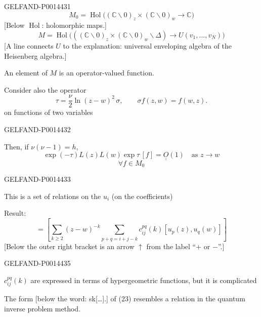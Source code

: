 \begin{GelfandAdjacentEvidence}{GELFAND-P001443}{1}
\[
M_0=\operatorname{Hol}\bigl((\mathbb C\backslash0)_z\times
(\mathbb C\backslash0)_w\longrightarrow\mathbb C\bigr)
\]
[Below \(\operatorname{Hol}\): holomorphic maps.]
\[
M=\operatorname{Hol}\bigl(((\mathbb C\backslash0)_z\times
(\mathbb C\backslash0)_w\backslash\Delta)\longrightarrow U(v_1,\ldots,v_N)\bigr)
\]
[A line connects \(U\) to the explanation: universal enveloping algebra of the Heisenberg algebra.]

An element of \(M\) is an operator-valued function.

Consider also the operator
\[
\tau=\frac{\nu}{2}\ln(z-w)^2\,\sigma,\qquad \sigma f(z,w)=f(w,z).
\]
on functions of two variables
\end{GelfandAdjacentEvidence}
\begin{GelfandAdjacentEvidence}{GELFAND-P001443}{2}


Then, if \(\nu(\nu-1)=h\),
\begin{equation*}
\exp(-\tau)L(z)L(w)\exp\tau\,[f]=\underline{\underline{O}}(1)
\quad\text{as }z\longrightarrow w \tag{23}
\end{equation*}
\[
\forall f\in M_0
\]
\end{GelfandAdjacentEvidence}
\begin{GelfandAdjacentEvidence}{GELFAND-P001443}{3}


This is a set of relations on the \(u_i\) (on the coefficients)

Result:
\begin{equation*}
[u_i(z),u_j(w)]=
\left[\sum_{k\geq2}(z-w)^{-k}
\sum_{p+q=i+j-k}c_{ij}^{pq}(k)[u_p(z),u_q(w)]\right] \tag{24}
\end{equation*}
[Below the outer right bracket is an arrow \(\uparrow\) from the label “\(+\) or \(-\)”.]

\end{GelfandAdjacentEvidence}
\begin{GelfandAdjacentEvidence}{GELFAND-P001443}{5}


\(c_{ij}^{pq}(k)\) are expressed in terms of hypergeometric functions, but it is complicated

The form [below the word: sk[…].] of (23) resembles a relation in the quantum inverse problem method.
\end{GelfandAdjacentEvidence}

